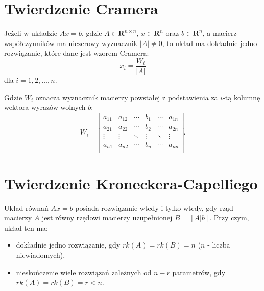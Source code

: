 \documentclass{article}
\begin{document}
\section{Twierdzenie Cramera}
Jeżeli w układzie $Ax = b$, gdzie $A \in \mathbf{R}^{n \times n}$,
$x \in \mathbf{R}^{n}$ oraz $b \in \mathbf{R}^{n}$, a macierz 
współczynników ma niezerowy wyznacznik $|A| \neq 0$, to układ ma 
dokładnie jedno rozwiązanie, które dane jest wzorem Cramera:
$$
    x_{i} = \frac{W_{i}}{|A|}
$$
dla $i = 1, 2, \dots, n$.

Gdzie $W_{i}$ oznacza wyznacznik macierzy powstałej z podstawienia
za $i$-tą kolumnę wektora wyrazów wolnych $b$:
$$
    W_{i}
    =
    \left|
    \begin{array}{cccccc}
        a_{11}  &   a_{12}  &   \cdots  &   b_{1}   &   \cdots  &   a_{1n}\\
        a_{21}  &   a_{22}  &   \cdots  &   b_{2}   &   \cdots  &   a_{2n}\\
        \vdots  &   \vdots  &   \ddots  &   \vdots  &   \ddots  &   \vdots \\
        a_{n1}  &   a_{n2}  &   \cdots  &   b_{n}   &   \cdots  &   a_{nn}\\
    \end{array}
    \right|.
$$

\section{Twierdzenie Kroneckera-Capelliego}
Układ równań $Ax = b$ posiada rozwiązanie wtedy i tylko wtedy,
gdy rząd macierzy $A$ jest równy rzędowi macierzy uzupełnionej
$B = [A|b]$.
Przy czym, układ ten ma:
\begin{itemize}
    \item dokładnie jedno rozwiązanie, gdy $rk(A) = rk(B) = n$
        ($n$ - liczba niewiadomych),
    \item nieskończenie wiele rozwiązań zależnych od $n-r$
        parametrów, gdy $rk(A) = rk(B) = r < n$.
\end{itemize}

\end{document}
